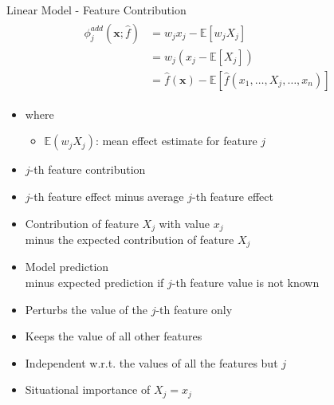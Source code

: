\begin{frame}[shrink=20]{Linear Model - Feature Contribution}
	\begin{align}
		\begin{split}
			\phi^{add}_j\left(\bm{x};\hat{f}\right)
			&=w_{j}x_j-\mathbb{E}\left[w_{j}X_{j}\right]\\
			&=w_{j}\left(x_j-\mathbb{E}\left[X_{j}\right]\right)\\
			&=\hat{f}(\bm{x}) - \mathbb{E}\left[\hat{f}(x_1, \dots, X_{j}, \dots, x_n)\right]
		\end{split}
	\end{align}
	\begin{itemize}\setlength\itemsep{0.5em}
		\item[]
		where
		\begin{itemize}
			\item $\mathbb{E}(w_{j}X_{j})$: mean effect estimate for feature $j$
		\end{itemize}
		\vspace{0.5em}
		\item<1-> $j$-th feature contribution
		\item<2-> $j$-th feature effect minus average $j$-th feature effect
		\item<3-> Contribution of feature $X_j$ with value $x_j$
		\\minus the expected contribution of feature $X_j$
		\item<4-> Model prediction
		\\minus expected prediction if $j$-th feature value is not known
		\item<5-> Perturbs the value of the $j$-th feature only
		\item<6-> Keeps the value of all other features
		\item<7-> Independent w.r.t. the values of all the features but $j$
		\item<8-> Situational importance of $X_j = x_j$~\cite{achen1982interpreting}
	\end{itemize}
\end{frame}
